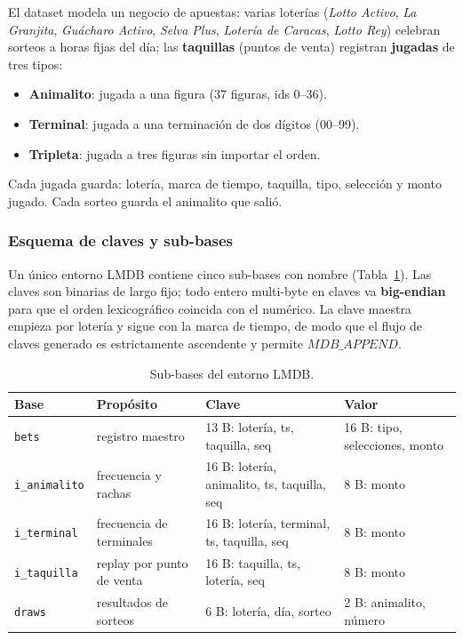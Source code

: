 \documentclass[12pt, letterpaper]{article}
\begin{document}
El dataset modela un negocio de apuestas: varias loterías (\emph{Lotto
Activo}, \emph{La Granjita}, \emph{Guácharo Activo}, \emph{Selva Plus},
\emph{Lotería de Caracas}, \emph{Lotto Rey}) celebran sorteos a horas fijas
del día; las \textbf{taquillas} (puntos de venta) registran \textbf{jugadas}
de tres tipos:

\begin{itemize}
    \item \textbf{Animalito}: jugada a una figura (37 figuras, ids 0--36).
    \item \textbf{Terminal}: jugada a una terminación de dos dígitos
    (00--99).
    \item \textbf{Tripleta}: jugada a tres figuras sin importar el orden.
\end{itemize}

Cada jugada guarda: lotería, marca de tiempo, taquilla, tipo, selección y
monto jugado. Cada sorteo guarda el animalito que salió.

\subsubsection{Esquema de claves y sub-bases}

Un único entorno LMDB contiene cinco sub-bases con nombre (Tabla~\ref{tab:subbases}).
Las claves son binarias de largo fijo; todo entero multi-byte en claves va
\textbf{big-endian} para que el orden lexicográfico coincida con el numérico.
La clave maestra empieza por lotería y sigue con la marca de tiempo, de modo
que el flujo de claves generado es estrictamente ascendente y permite
$MDB\_APPEND$.

\begin{table}[H]
\centering
\caption{Sub-bases del entorno LMDB.}
\label{tab:subbases}
\footnotesize
\begin{tabularx}{\textwidth}{@{}l X X X@{}}
\toprule
\textbf{Base} & \textbf{Propósito} & \textbf{Clave} & \textbf{Valor} \\
\midrule
\texttt{bets} & registro maestro & 13 B: lotería, ts, taquilla, seq & 16 B: tipo, selecciones, monto \\
\texttt{i\_animalito} & frecuencia y rachas & 16 B: lotería, animalito, ts, taquilla, seq & 8 B: monto \\
\texttt{i\_terminal} & frecuencia de terminales & 16 B: lotería, terminal, ts, taquilla, seq & 8 B: monto \\
\texttt{i\_taquilla} & replay por punto de venta & 16 B: taquilla, ts, lotería, seq & 8 B: monto \\
\texttt{draws} & resultados de sorteos & 6 B: lotería, día, sorteo & 2 B: animalito, número \\
\bottomrule
\end{tabularx}
\end{table}
\end{document}
